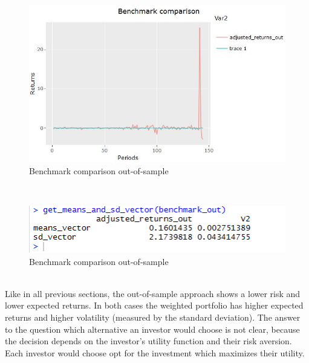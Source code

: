 \documentclass{article}
\begin{document}
\begin {figure}[H]
    \begin{center}
    \includegraphics[scale=0.7]{Benchmark_out_of_sample_MV.JPG}
    \caption{Benchmark comparison out-of-sample}
    \end{center}
\end{figure}\\
\begin {figure}[H]
    \begin{center}
    \includegraphics[scale=0.6]{benchmark_comparison_pf_returns_quantified_summary_out_of_sample.PNG}
    \caption{Benchmark comparison out-of-sample}
    \end{center}
\end{figure}\\
Like in all previous sections, the out-of-sample approach shows a lower risk and lower expected returns. In both cases the weighted portfolio has higher expected returns and higher volatility (measured by the standard deviation). The answer to the question which alternative an investor would choose is not clear, because the decision depends on the investor's utility function and their risk aversion. Each investor would choose opt for the investment which maximizes their utility.
\end{document}
